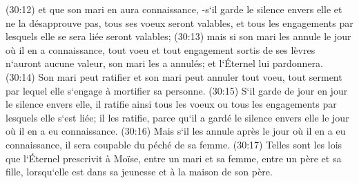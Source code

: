 \verse (30:12) et que son mari en aura connaissance, -s`il garde le silence envers elle et ne la désapprouve pas, tous ses voeux seront valables, et tous les engagements par lesquels elle se sera liée seront valables; 
\verse (30:13) mais si son mari les annule le jour où il en a connaissance, tout voeu et tout engagement sortis de ses lèvres n`auront aucune valeur, son mari les a annulés; et l`Éternel lui pardonnera. 
\verse (30:14) Son mari peut ratifier et son mari peut annuler tout voeu, tout serment par lequel elle s`engage à mortifier sa personne. 
\verse (30:15) S`il garde de jour en jour le silence envers elle, il ratifie ainsi tous les voeux ou tous les engagements par lesquels elle s`est liée; il les ratifie, parce qu`il a gardé le silence envers elle le jour où il en a eu connaissance. 
\verse (30:16) Mais s`il les annule après le jour où il en a eu connaissance, il sera coupable du péché de sa femme. 
\verse (30:17) Telles sont les lois que l`Éternel prescrivit à Moïse, entre un mari et sa femme, entre un père et sa fille, lorsqu`elle est dans sa jeunesse et à la maison de son père. 

\chapter{}

